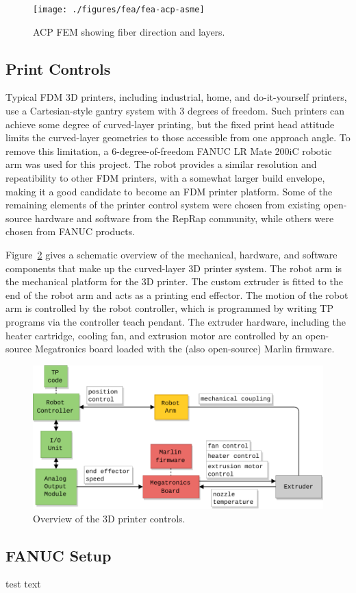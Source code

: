 \begin{figure}[htp]
\centering
\texttt{[image: ./figures/fea/fea-acp-asme]}
\caption{ACP FEM showing fiber direction and layers.}
\label{fig:fea-acp-asme}
\end{figure}


\subsection*{Print Controls}

Typical FDM 3D printers, including industrial, home, and do-it-yourself printers, use a Cartesian-style gantry system with 3 degrees of freedom. Such printers can achieve some degree of curved-layer printing, but the fixed print head attitude limits the curved-layer geometries to those accessible from one approach angle. To remove this limitation, a 6-degree-of-freedom FANUC LR Mate 200iC robotic arm was used for this project. The robot provides a similar resolution and repeatibility to other FDM printers, with a somewhat larger build envelope, making it a good candidate to become an FDM printer platform. Some of the remaining elements of the printer control system were chosen from existing open-source hardware and software from the RepRap community, while others were chosen from FANUC products.

Figure~\ref{fig:sys-overview} gives a schematic overview of the mechanical, hardware, and software components that make up the curved-layer 3D printer system. The robot arm is the mechanical platform for the 3D printer. The custom extruder is fitted to the end of the robot arm and acts as a printing end effector. The motion of the robot arm is controlled by the robot controller, which is programmed by writing TP programs via the controller teach pendant. The extruder hardware, including the heater cartridge, cooling fan, and extrusion motor are controlled by an open-source Megatronics board loaded with the (also open-source) Marlin firmware. 

\begin{figure}[t]
    \centering
    \includegraphics[width=.8\linewidth]{figures/diagrams/system overview}
    \caption{Overview of the 3D printer controls.}
    \label{fig:sys-overview}
\end{figure}

\subsection*{FANUC Setup}

test text\\
